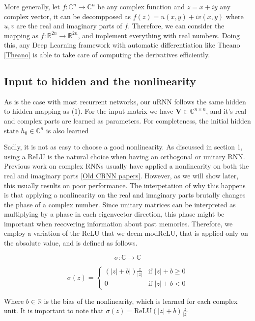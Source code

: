 \documentclass{article} %
\newcommand{\matr}[1]{\mathbf{#1}}
\newcommand\RR{\mathbb{R}}
\newcommand\CC{\mathbb{C}}
\begin{document}
More generally, let $f: \CC^n \rightarrow \CC^n$ be any complex function and $z = x + i y$ any complex vector, it can be decompposed as $ f(z) = u(x, y) + i v(x, y) $ where $u,v$ are the real and imaginary parts of $f$. Therefore, we can consider the mapping as $f: \RR^{2n}  \rightarrow \RR^{2n}$, and implement everything with real numbers. Doing this, any Deep Learning framework with automatic differentiation like Theano \ref{Theano} is able to take care of computing the derivatives efficiently.

\subsection{Input to hidden and the nonlinearity}

As is the case with most recurrent networks, our uRNN follows the same hidden to hidden mapping as (1). For the input matrix we have $\matr{V} \in \CC^{n \times n}$, and it's real and complex parts are learned as parameters. For completeness, the initial hidden state $h_0 \in \CC^n$ is also learned 

Sadly, it is not as easy to choose a good nonlinearity. As discussed in section 1, using a ReLU is the natural choice when having an orthogonal or unitary RNN. Previous work on complex RNNs usually have applied a nonlinearity on both the real and imaginary parts \ref{Old CRNN papers}. However, as we will show later, this usually results on poor performance. The interpetation of why this happens is that applying a nonlinearity on the real and imaginary parts brutally changes the phase of a complex number. Since unitary matrices can be interpreted as multiplying by a phase in each eigenvector direction, this phase might be important when recovering information about past memories. Therefore, we employ a variation of the ReLU that we deem modReLU, that is applied only on the absolute value, and is defined as follows.

$$ \sigma: \CC \rightarrow \CC $$

$$ \sigma (z) = 
\left\{
  \begin{array}{ll}
    (|z|+b|) \frac{z}{|z|}  & \mbox{if } |z| + b \geq 0 \\
    0 & \mbox{if } |z| + b < 0
  \end{array}
\right.
$$


Where $b \in \RR$ is the bias of the nonlinearity, which is learned for each complex unit. It is important to note that $\sigma(z) = \text{ReLU}(|z| + b) \frac{z}{|z|}$
\end{document}
